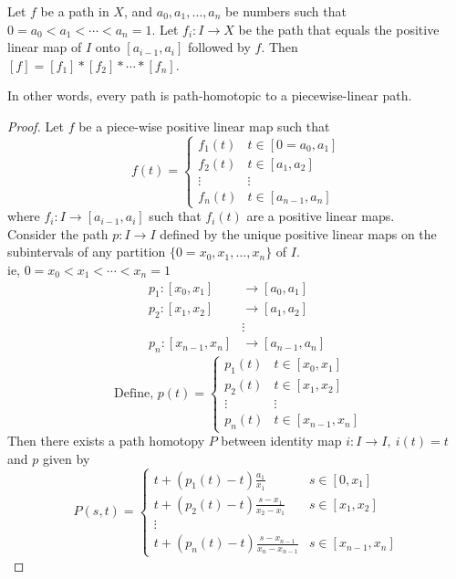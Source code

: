 \begin{theorem}
	Let $f$ be a path in $X$, and $a_0, a_1, \dots, a_n$ be numbers such that $0 = a_0 < a_1 < \dotsb < a_n = 1$.
	Let $f_i : I \to X$ be the path that equals the positive linear map of $I$ onto $[a_{i-1},a_i]$ followed by $f$.
	Then $[f] = [f_1] \ast{} [f_2] \ast{} \dotsm \ast{} [f_n]$.
	\begin{commentary}
	In other words, every path is path-homotopic to a piecewise-linear path.
	\end{commentary}
\end{theorem}
\begin{proof}
	Let $f$ be a piece-wise positive linear map such that
	\[ f(t) = \begin{cases} f_1(t) & t \in [0=a_0,a_1] \\ f_2(t) & t \in [a_1,a_2] \\ \vdots & \vdots \\ f_n(t) & t \in [a_{n-1},a_n] \end{cases} \]
	where $f_i : I \to [a_{i-1},a_i]$ such that $f_i(t)$ are a positive linear maps. \\

	Consider the path $p : I \to I$  defined by the unique positive linear maps on the subintervals of any partition $\{ 0 = x_0, x_1, \dots, x_n \}$ of $I$. \\
	ie, $0 = x_0 < x_1 < \dotsb < x_n=1$
	\begin{align*}
		p_1 : [x_0,x_1] & \to [a_0,a_1] \\
		p_2 : [x_1,x_2] & \to [a_1,a_2] \\
		& \vdots \\
		p_n : [x_{n-1},x_n] & \to [a_{n-1},a_n]
	\end{align*}
	\[ \text{ Define, } p(t) = \begin{cases} p_1(t) & t \in [x_0,x_1] \\ p_2(t) & t \in [x_1,x_2] \\  \vdots  & \vdots \\ p_n(t) & t \in [x_{n-1},x_n]\end{cases} \]
	Then there exists a path homotopy $P$ between identity map $i : I \to I,\ i(t) = t$  and $p$ given by
	\[ P(s,t) = \begin{cases} t + (p_1(t)-t)\frac{a_1}{x_1} & s \in [0,x_1] \\ t + (p_2(t)-t)\frac{s-x_1}{x_2-x_1} & s \in [x_1,x_2] \\ \vdots & \\ t + (p_n(t)-t)\frac{s-x_{n-1}}{x_n - x_{n-1}} & s \in [x_{n-1},x_n] \end{cases} \]
	

\end{proof}
